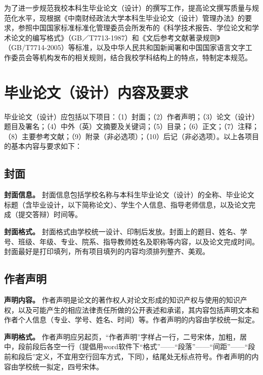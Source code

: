 \documentclass[singlesided]{Style/ucasthesis}%
\begin{document}
\raggedbottom

为了进一步规范我校本科生毕业论文（设计）的撰写工作，提高论文撰写质量与规范化水平，现根据《中南财经政法大学本科生毕业论文（设计）管理办法》的要求，参照中国国家标准标准化管理委员会所发布的《科学技术报告、学位论文和学术论文的编写格式》（GB／T7713-1987）和《文后参考文献著录规则》（GB/T7714-2005）等标准，以及中华人民共和国新闻署和中国国家语言文字工作委员会等机构发布的相关规则，结合我校学科结构上的特点，特制定本规范。

\hypertarget{section-10}{%
\section{毕业论文（设计）内容及要求}\label{section-10}}

毕业论文（设计）应包括以下项目：（1）封面；（2）作者声明；（3）论文（设计）题目及署名；（4）中外（英）文摘要及关键词；（5）目录；（6）正文；（7）注释；（8）主要参考文献；（9）附录（非必选项）；（10）后记（非必选项）。以上各项目的基本内容与要求如下：

\hypertarget{section-11}{%
\subsection{封面}\label{section-11}}

\textbf{封面信息。} 封面信息包括学校名称与本科生毕业论文（设计）的全称、毕业论文标题（含毕业设计，以下简称论文）、学生个人信息、指导老师信息，以及论文完成（提交答辩）时间等。

\textbf{封面格式。} 封面格式由学校统一设计、印制后发放。封面上的题目、姓名、学号、班级、年级、专业、院系、指导教师姓名及职称等内容，以及论文完成时间。封面最好是打印填列，所有项目填列的内容均须排列整齐、美观。

\hypertarget{section-12}{%
\subsection{作者声明}\label{section-12}}

\textbf{声明内容。} 作者声明是论文的著作权人对论文形成的知识产权与使用的知识产权，以及可能产生的相应法律责任所做的公开表述和承诺，其内容包括声明文本和作者个人信息（专业、学号、姓名、时间）等。作者声明的内容由学校统一拟定。

\textbf{声明格式。} 作者声明应另起页，``作者声明''字样占一行，二号宋体，加粗，居中，段前段后各空一行（提倡用word软件下``格式''------``段落''------``间距''------``段前和段后''定义，不宜用空行回车方式，下同），结尾处无标点符号。作者声明的内容由学校统一拟定，四号宋体。
\end{document}
